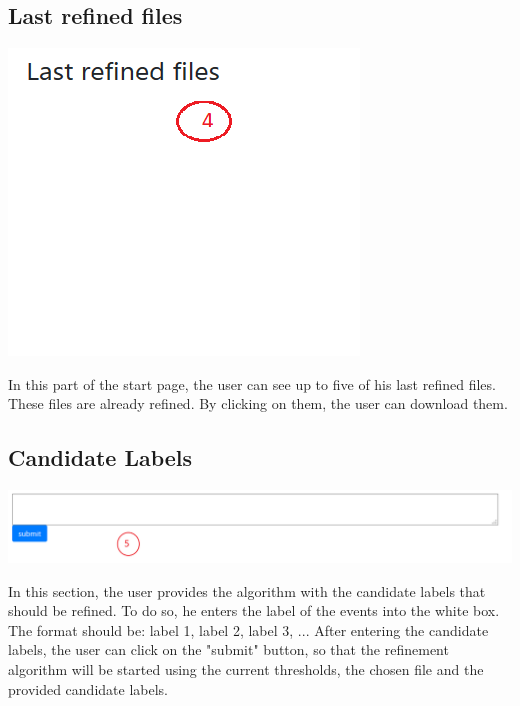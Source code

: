 \documentclass[notitlepage]{article}
\begin{document}
\begin{flushleft}
\subsection{Last refined files}

\includegraphics[scale=0.5]{lastRefinedFile.png}

In this part of the start page, the user can see up to five of his last refined files. These files are already refined. By clicking on them, the user can download them.

\subsection{Candidate Labels}

\includegraphics[scale=0.5]{candidateLabels.png}

In this section, the user provides the algorithm with the candidate labels that should be refined. To do so, he enters the label of the events into the white box. The format should be: label 1, label 2, label 3, ...
After entering the candidate labels, the user can click on the "submit" button, so that the refinement algorithm will be started using the current thresholds, the chosen file and the provided candidate labels.

\end{flushleft}
%
\end{document}
